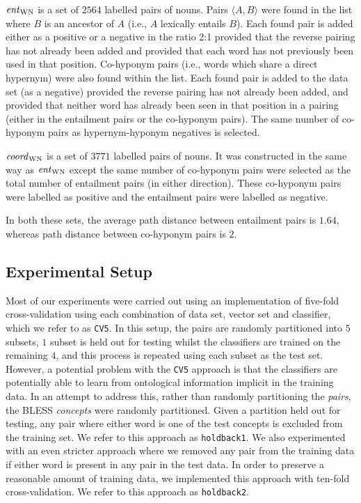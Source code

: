 \documentclass[11pt]{article}
\newcommand\entWN{\mbox{\em ent\/}_{\mbox{\scriptsize WN}}}
\newcommand\coordWN{\mbox{\em coord\/}_{\mbox{\scriptsize WN}}}
\begin{document}
\smallskip

\noindent $\entWN$ is a set of $2564$ labelled pairs of nouns.  Pairs $\langle A,B\rangle$ were found in the list where $B$ is an ancestor of $A$ (i.e., $A$ lexically entails $B$).  Each found pair is added either as a positive or a negative in the ratio 2:1 provided that the reverse pairing has not already been added and provided that each word has not previously been used in that position.  Co-hyponym pairs (i.e., words which share a direct hypernym) were also found within the list.  Each found pair is added to the data set (as a negative) provided the reverse pairing has not already been added, and provided that neither word has already been seen in that position in a pairing (either in the entailment pairs or the co-hyponym pairs).  The same number of co-hyponym pairs as hypernym-hyponym negatives is selected. 

\smallskip

\noindent $\coordWN$ is a set of $3771$ labelled pairs of nouns.  It was constructed in the same way as $\entWN$ except the same number of co-hyponym pairs were selected as the total number of entailment pairs (in either direction).  These co-hyponym pairs were labelled as positive and the entailment pairs were labelled as negative.

\smallskip

In both these sets, the average path distance between entailment pairs is $1.64$, whereas path distance between co-hyponym pairs is $2$.

\subsection{Experimental Setup}

Most of our experiments were carried out using an implementation of five-fold cross-validation using each combination of data set, vector set and classifier, which we refer to as \texttt{CV5}.  In this setup, the pairs are randomly partitioned into $5$ subsets, $1$ subset is held out for testing whilst the classifiers are trained on the remaining $4$, and this process is repeated using each subset as the test set.  However, a potential problem with the \texttt{CV5} approach is that the classifiers are potentially able to learn from ontological information implicit in the training data. In an attempt to address this, rather than randomly partitioning the \emph{pairs}, the BLESS \emph{concepts} were randomly partitioned. Given a partition held out for testing, any pair where either word is one of the test concepts is excluded from the training set.  We refer to this approach as \texttt{holdback1}.  We also experimented with an even stricter approach where we removed any pair from the training data if either word is present in any pair in the test data.  In order to preserve a reasonable amount of training data, we implemented this approach with ten-fold cross-validation.  We refer to this approach as \texttt{holdback2}.
\end{document}
